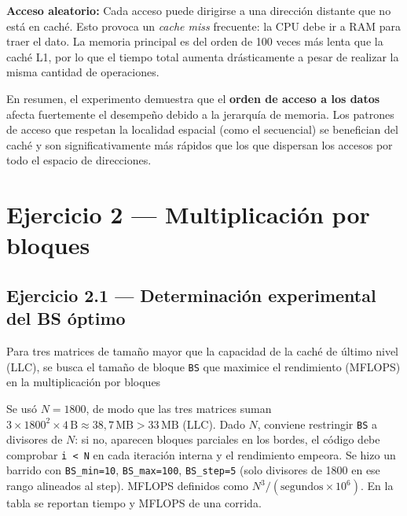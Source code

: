 \documentclass[11pt,a4paper]{article}
\begin{document}
\textbf{Acceso aleatorio:} Cada acceso puede dirigirse a una dirección distante que no está en caché. Esto provoca un \emph{cache miss} frecuente: la CPU debe ir a RAM para traer el dato. La memoria principal es del orden de 100 veces más lenta que la caché L1, por lo que el tiempo total aumenta drásticamente a pesar de realizar la misma cantidad de operaciones.

En resumen, el experimento demuestra que el \textbf{orden de acceso a los datos} afecta fuertemente el desempeño debido a la jerarquía de memoria. Los patrones de acceso que respetan la localidad espacial (como el secuencial) se benefician del caché y son significativamente más rápidos que los que dispersan los accesos por todo el espacio de direcciones.

\section{Ejercicio 2 --- Multiplicación por bloques}

\subsection{Ejercicio 2.1 --- Determinación experimental del BS óptimo}

Para tres matrices de tamaño mayor que la capacidad de la caché de último nivel (LLC), se busca el tamaño de bloque \texttt{BS} que maximice el rendimiento (MFLOPS) en la multiplicación por bloques 

Se usó \(N = 1800\), de modo que las tres matrices suman \(3 \times 1800^2 \times 4\,\text{B} \approx 38{,}7\,\text{MB} > 33\,\text{MB}\) (LLC). Dado \(N\), conviene restringir \texttt{BS} a divisores de \(N\): si no, aparecen bloques parciales en los bordes, el código debe comprobar \texttt{i < N} en cada iteración interna y el rendimiento empeora. Se hizo un barrido con \texttt{BS\_min=10}, \texttt{BS\_max=100}, \texttt{BS\_step=5} (solo divisores de 1800 en ese rango alineados al step). MFLOPS definidos como \(N^3 / (\text{segundos} \times 10^6)\). En la tabla se reportan tiempo y MFLOPS de una corrida.
\end{document}

